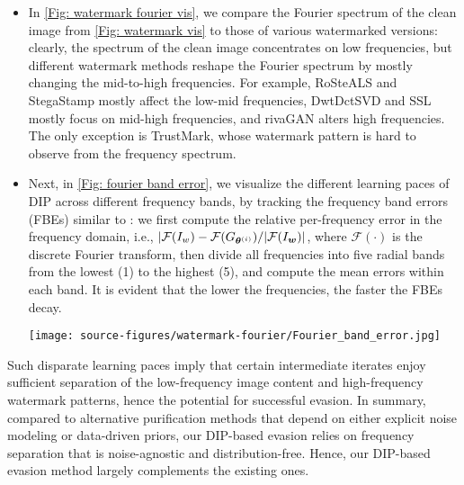 \begin{itemize}[nosep,leftmargin=1em]
    \item In \cref{Fig: watermark fourier vis}, we compare the Fourier spectrum of the clean image from \cref{Fig: watermark vis} to those of various watermarked versions: clearly, the spectrum of the clean image concentrates on low frequencies, but different watermark methods reshape the Fourier spectrum by mostly changing the mid-to-high frequencies. For example, RoSteALS and StegaStamp mostly affect the low-mid frequencies, DwtDctSVD and SSL mostly focus on mid-high frequencies, and rivaGAN alters high frequencies. The only exception is TrustMark, whose watermark pattern is hard to observe from the frequency spectrum. 

    \item Next, in \cref{Fig: fourier band error}, we visualize the different learning paces of DIP across different frequency bands, by tracking the frequency band errors (FBEs) similar to \cite{wang2024dmplug,li2023deep,zhuang2024blind}: we first compute the relative per-frequency error in the frequency domain, i.e., $|\mathcal{F}(I_w) - \mathcal{F}(G_{\boldsymbol \theta^{(i)}}) / |\mathcal{F} (I_{\boldsymbol w})| $, where $\mathcal{F} (\cdot)$ is the discrete Fourier transform, then divide all frequencies into five radial bands from the lowest (1) to the highest (5), and compute the mean errors within each band. It is evident that the lower the frequencies, the faster the FBEs decay. 
    \begin{SCfigure}[][!htbp]
    \texttt{[image: source-figures/watermark-fourier/Fourier\_band\_error.jpg]}
    \caption{Evolution of the Fourier band errors (FBEs) of DIP's intermediate iterates ($x$-axis: iteration count; $y$-axis: relative band error). We visualize FBEs by dividing all frequency components into five different bands in the radial direction, from the lowest (1) to hightest (5).}
    \label{Fig: fourier band error}
    \vspace{-1em}
\end{SCfigure}
\end{itemize}
Such disparate learning paces imply that certain intermediate iterates enjoy sufficient separation of the low-frequency image content and high-frequency watermark patterns, hence the potential for successful evasion. In summary, compared to alternative purification methods that depend on either explicit noise modeling or data-driven priors, our DIP-based evasion relies on frequency separation that is noise-agnostic and distribution-free. Hence, our DIP-based evasion method largely complements the existing ones. 

